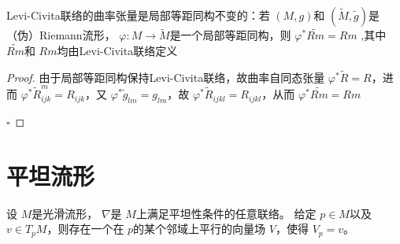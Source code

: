 \documentclass[../../几何与拓扑.tex]{subfiles}
\begin{document}
\begin{proposition}
    Levi-Civita联络的曲率张量是局部等距同构不变的：若 \(  \left( M,g \right)   \)和 \(  \left( \tilde{M},\tilde{g}  \right)   \)是（伪）Riemann流形， \(   \varphi :M\to \tilde{M}  \)是一个局部等距同构，则 \(   \varphi ^{*} \widetilde{Rm}= Rm  \)   ,其中 \(  \widetilde{Rm}  \)和 \(  Rm  \)均由Levi-Civita联络定义   
\end{proposition}
\begin{proof}
    由于局部等距同构保持Levi-Civita联络，故曲率自同态张量 \(   \varphi ^{*}\tilde{R}= R  \)，进而 \(  \varphi ^{*} \tilde{R}_{ijk}^{m}= R_{ijk}  \)，又 \(   \varphi ^{*}\tilde{g} _{lm}= g_{lm}  \)，故 \( \varphi ^{*}  \tilde{R}_{ijkl}= R_{ijkl}  \)，从而     \(   \varphi ^{*} \widetilde{Rm}= Rm  \) 

    \hfill $\square$
\end{proof}


\section{平坦流形}

\begin{lemma}
    设 \(  M  \)是光滑流形， \(   \nabla   \)是 \(  M  \)上满足平坦性条件的任意联络。
    给定 \(  p \in M  \)以及 \(  v \in T_{p}M  \)，则存在一个在 \(  p  \)的某个邻域上平行的向量场 \(  V  \)，使得 \(  V_{p}= v  \)。        
\end{lemma}
\end{document}

